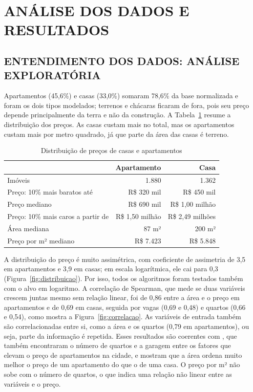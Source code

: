 \documentclass[
  article,
  a4paper,
  12pt,
  fleqn,
  oneside,
  chapter = TITLE,
  section = TITLE,
]{abntex2}
\begin{document}
\section{ANÁLISE DOS DADOS E RESULTADOS}\label{sec:resultados}

\subsection{ENTENDIMENTO DOS DADOS: ANÁLISE EXPLORATÓRIA}\label{sec:eda}

Apartamentos (45,6\%) e casas (33,0\%) somaram 78,6\% da base normalizada e foram os dois tipos modelados; terrenos e chácaras ficaram de fora, pois seu preço depende principalmente da terra e não da construção. A Tabela~\ref{tab:precos} resume a distribuição dos preços. As casas custam mais no total, mas os apartamentos custam mais por metro quadrado, já que parte da área das casas é terreno.

\begin{table}[!htb]
  \caption{Distribuição de preços de casas e apartamentos}
  \label{tab:precos}
  \centering
  \begin{tabular}{lrr}
    \hline
    & \textbf{Apartamento} & \textbf{Casa} \\
    \hline
    Imóveis & 1.880 & 1.362 \\
    Preço: 10\% mais baratos até & R\$ 320 mil & R\$ 450 mil \\
    Preço mediano & R\$ 690 mil & R\$ 1,00 milhão \\
    Preço: 10\% mais caros a partir de & R\$ 1,50 milhão & R\$ 2,49 milhões \\
    Área mediana & 87 m² & 200 m² \\
    Preço por m² mediano & R\$ 7.423 & R\$ 5.848 \\
    \hline
  \end{tabular}
\end{table}

A distribuição do preço é muito assimétrica, com coeficiente de assimetria de 3,5 em apartamentos e 3,9 em casas; em escala logarítmica, ele cai para 0,3 (Figura~\ref{fig:distribuicao}). Por isso, todos os algoritmos foram testados também com o alvo em logaritmo. A correlação de Spearman, que mede se duas variáveis crescem juntas mesmo sem relação linear, foi de 0,86 entre a área e o preço em apartamentos e de 0,69 em casas, seguida por vagas (0,69 e 0,48) e quartos (0,66 e 0,54), como mostra a Figura~\ref{fig:correlacao}. As variáveis de entrada também são correlacionadas entre si, como a área e os quartos (0,79 em apartamentos), ou seja, parte da informação é repetida. Esses resultados são coerentes com \textcite{reza2025}, que também encontraram o número de quartos e a garagem entre os fatores que elevam o preço de apartamentos na cidade, e mostram que a área ordena muito melhor o preço de um apartamento do que o de uma casa. O preço por m² não sobe com o número de quartos, o que indica uma relação não linear entre as variáveis e o preço.
\end{document}
